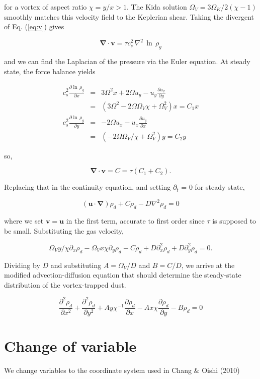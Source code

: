 \documentclass[useAMS,8pt,twocolumn]{article}
\newcommand{\pderiv}[2]{\frac{\partial #1}{\partial #2}}
\newcommand{\pderivn}[3]{\frac{\partial^{#3} #1}{\partial #2^{#3}}}
\renewcommand{\v}[1]{{\boldsymbol{#1}}} %
\newcommand{\del}{\v{\nabla}}
\newcommand{\Div}{\del\cdot}
\newcommand{\Laplace}{\nabla^2}
\newcommand{\Eq}[1]{Eq. (\ref{#1})}
\newcommand{\eq}[1]{\Eq{#1}}
\newcommand{\beq}{\begin{equation}}
\newcommand{\eeq}{\end{equation}}
\begin{document}
\noindent for a vortex of aspect ratio $\chi= y/x > 1$. The Kida
solution $\varOmega_V = 3\Omega_K/2(\chi-1)$ smoothly matches 
this velocity field to the Keplerian shear. Taking the divergent of
\eq{eq:v} gives 

\beq
\Div{\v{v}} = \tau c_s^2 \, \Laplace{\, \ln \, \rho_g} 
\label{eq:divv}
\eeq

\noindent and we can find the Laplacian of the pressure via the Euler
equation. At steady state, the force balance yields 

\begin{eqnarray}
c_s^2 \pderiv{\ln \,\rho_g}{x} &=& 3\varOmega^2 x + 2\varOmega u_y -
u_y\pderiv{u_x}{y} \nonumber \\
&=& \left(3\varOmega^2 - 2\Omega\Omega_V \chi + \varOmega_V^2\right) x  = C_1 x  \\
c_s^2 \pderiv{\ln \,\rho_g}{y} &=& - 2\varOmega u_x -
u_x\pderiv{u_y}{x} \nonumber \\
&=& \left(-2\Omega\Omega_V/\chi + \Omega_V^2\right) y = C_2 y
\end{eqnarray}

\noindent  so, 

\beq
\Div{\v{v}} = C = \tau (C_1+C_2).
\eeq

\noindent Replacing that in the continuity equation, and setting $\partial_t$ =
0 for steady state, 

\beq
  (\v{u}\cdot\del)\rho_d + C \rho_d  - D\Laplace{\rho_d} = 0 
\eeq

\noindent where we set $\v{v}=\v{u}$ in the first term, accurate to
first order since $\tau$ is supposed to be small. Substituting the gas velocity,

\beq
   \Omega_V y / \chi \partial_x \rho_d -  \Omega_V x \chi \partial_y
  \rho_d - C \rho_d  + D\partial_x^2{\rho_d} + D\partial_y^2{\rho_d} = 0.
\eeq

Dividing by $D$ and substituting $A=\varOmega_V/D$ and $B=C/D$, we
arrive at the modified advection-diffusion equation that should
determine the steady-state distribution of the vortex-trapped dust.

\beq
  \pderivn{\rho_d}{x}{2} + \pderivn{\rho_d}{y}{2} + A  y\chi^{-1} \pderiv{\rho_d}{x} -  A x \chi \pderiv{\rho_d}{y} - B \rho_d   = 0 
\eeq


\section{Change of variable}

We change variables to the coordinate system used in Chang \& Oishi (2010)
\end{document}
